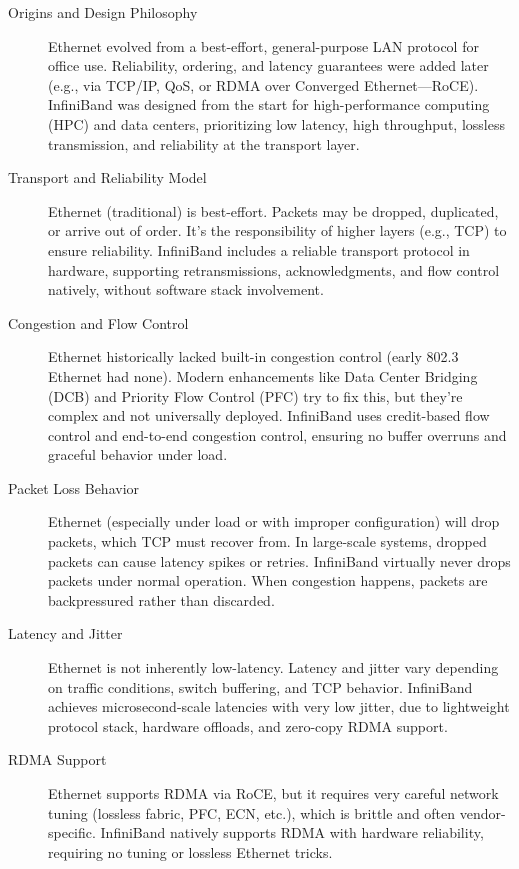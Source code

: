 \documentclass[../../../OAE-SPEC-MAIN.tex]{subfiles}
\begin{document}
\begin{description}
\item  [Origins and Design Philosophy]
Ethernet evolved from a best-effort, general-purpose LAN protocol for office use. Reliability, ordering, and latency guarantees were added later (e.g., via TCP/IP, QoS, or RDMA over Converged Ethernet—RoCE).
InfiniBand was designed from the start for high-performance computing (HPC) and data centers, prioritizing low latency, high throughput, lossless transmission, and reliability at the transport layer.

\item [Transport and Reliability Model]
Ethernet (traditional) is best-effort. Packets may be dropped, duplicated, or arrive out of order. It's the responsibility of higher layers (e.g., TCP) to ensure reliability.
InfiniBand includes a reliable transport protocol in hardware, supporting retransmissions, acknowledgments, and flow control natively, without software stack involvement.

\item [Congestion and Flow Control]
Ethernet historically lacked built-in congestion control (early 802.3 Ethernet had none). Modern enhancements like Data Center Bridging (DCB) and Priority Flow Control (PFC) try to fix this, but they're complex and not universally deployed.
InfiniBand uses credit-based flow control and end-to-end congestion control, ensuring no buffer overruns and graceful behavior under load.

\item [Packet Loss Behavior]
Ethernet (especially under load or with improper configuration) will drop packets, which TCP must recover from. In large-scale systems, dropped packets can cause latency spikes or retries.
InfiniBand virtually never drops packets under normal operation. When congestion happens, packets are backpressured rather than discarded.

\item [Latency and Jitter]
Ethernet is not inherently low-latency. Latency and jitter vary depending on traffic conditions, switch buffering, and TCP behavior.
InfiniBand achieves microsecond-scale latencies with very low jitter, due to lightweight protocol stack, hardware offloads, and zero-copy RDMA support.

\item [RDMA Support]
Ethernet supports RDMA via RoCE, but it requires very careful network tuning (lossless fabric, PFC, ECN, etc.), which is brittle and often vendor-specific.
InfiniBand natively supports RDMA with hardware reliability, requiring no tuning or lossless Ethernet tricks.


\end{description}
\end{document}
